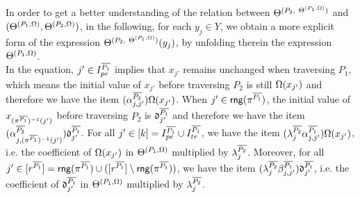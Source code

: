 In order to get a better understanding of the relation between $\Theta^{(P_2,\ \Theta^{(P_1,\Omega)})}$ and $(\Theta^{(P_1, \Omega)},\Theta^{(P_2, \Omega)})$, in the following, for each $y_j \in Y$, we obtain a more explicit form of the expression $\sumf^{(P_2,\ \sumf^{(P_1,\initval)})}(y_j)$, by unfolding therein the expression $\Theta^{(P_1,\Omega)}$\medskip.
\medskip\\
In the equation, $j'\in  I^{\overline{P_1}}_{pe}$ implies that $x_{j'}$ remains unchanged when traversing $P_1$, which means the initial value of $x_{j'}$ before traversing $P_2$ is still $\Omega(x_{j'})$ and therefore we have the item $ (\alpha^{\overline{P_2}}_{j,j'}) \Omega(x_{j'})$. When $j' \in \mathsf{rng}(\pi^{\overline{P_1}})$, the initial value of $x_{(\pi^{\overline{P_1}})^{-1}(j')}$ before traversing $P_2$ is $\mathfrak{d}^{\overline{P_1}}_{j'}$ and therefore we have the item $( \alpha^{\overline{P_2}}_{j,(\pi^{\overline{P_1}})^{-1}(j')}) \mathfrak{d}^{\overline{P_1}}_{j'}$.
For all $j'\in [k] = I^{\overline{P_1}}_{pe} \cup I^{\overline{P_1}}_{tr}$, we have the item $(\lambda^{\overline{P_2}}_{j} \alpha^{\overline{P_1}}_{j,j'}) \Omega(x_{j'})$, i.e. the coefficient of $\Omega(x_{j'})$ in $\Theta^{(P_1, \Omega)}$ multiplied by $\lambda^{\overline{P_2}}_{j}$. Moreover, for all $j'\in [r^{\overline{P_1}}] = \mathsf{rng}(\pi^{\overline{P_1}}) \cup ([r^{\overline{P_1}}] \setminus \mathsf{rng}(\pi^{\overline{P_1}}))$, we have 
the item $( \lambda^{\overline{P_2}}_{j} \beta^{\overline{P_1}}_{j,j'}) \mathfrak{d}^{\overline{P_1}}_{j'}$, i.e. the coefficient of $\mathfrak{d}^{\overline{P_1}}_{j'}$ in $\Theta^{(P_1, \Omega)}$ multiplied by $\lambda^{\overline{P_2}}_{j}$.

